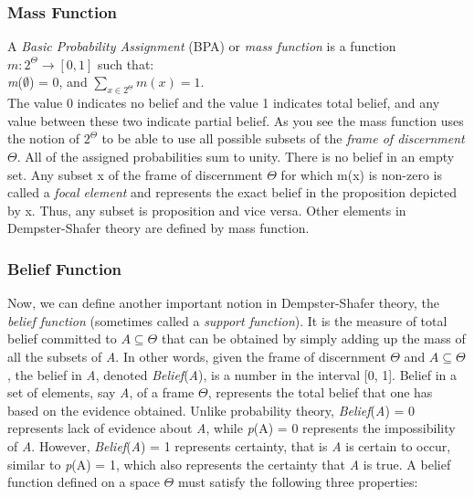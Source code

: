 \documentclass[11pt]{article}
\begin{document}
\subsubsection{Mass Function}

A \textit{Basic Probability Assignment} (BPA) or \textit{mass function}
is a function $m:2^\Theta\rightarrow[0,1]$ such that:\\

\textit{m}($\emptyset$) = 0, and $\sum\limits_{x\in2^\Theta}m(x) =1$.\\

The value 0 indicates no belief and the value 1 indicates total belief, and
any value between these two indicate partial belief. As you see the mass
function uses the notion of $2^\Theta$ to be able to use all possible subsets of
the \textit{frame of discernment} $\Theta$. All of the assigned probabilities
sum to unity. There is no belief in an empty set. Any subset x of the frame of
discernment $\Theta$ for which m(x) is non-zero is called a \textit{focal
element} and represents the exact belief in the proposition depicted by x. Thus,
any subset is proposition and vice versa. Other elements in Dempster-Shafer
theory are defined by mass function. 

\subsubsection{Belief Function}

Now, we can define another important notion in Dempster-Shafer theory, the
\textit{belief function} (sometimes called a \textit{support function}). It is
the measure of total belief committed to $A \subseteq \Theta$ that can be
obtained by simply adding up the mass of all the subsets of \textit{A}. In other
words, given the frame of discernment $\Theta$ and $A \subseteq \Theta$, the
belief in \textit{A}, denoted \textit{Belief}(\textit{A}), is a number in the
interval [0, 1]. Belief in a set of elements, say \textit{A}, of a frame
$\Theta$, represents the total belief that one has based on the evidence
obtained. Unlike probability theory, \textit{Belief}(\textit{A}) = 0 represents
lack of evidence about \textit{A}, while \textit{p}(A) = 0 represents the
impossibility of \textit{A}. However, \textit{Belief}(\textit{A}) = 1 represents
certainty, that is \textit{A} is certain to occur, similar to \textit{p}(A) = 1,
which also represents the certainty that \textit{A} is true. A belief function
defined on a space $\Theta$ must satisfy the following three properties:
\end{document}
